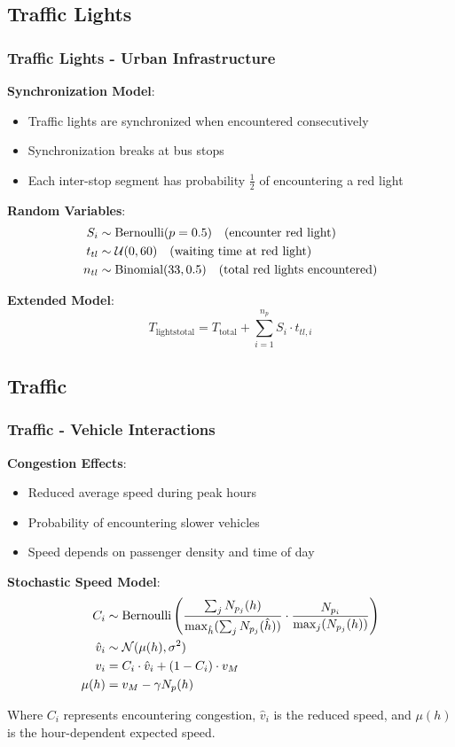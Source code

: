 \documentclass[12pt]{beamer}
\begin{document}
\subsection{Traffic Lights}
\begin{frame}
\frametitle{Traffic Lights - Urban Infrastructure}
\textbf{Synchronization Model}:
\begin{itemize}
\item Traffic lights are synchronized when encountered consecutively
\item Synchronization breaks at bus stops
\item Each inter-stop segment has probability $\frac{1}{2}$ of encountering a red light
\end{itemize}

\vspace{0.3cm}
\textbf{Random Variables}:
\begin{align}
S_i &\sim \text{Bernoulli}(p = 0.5) \quad \text{(encounter red light)}  \notag\\
t_{tl} &\sim \mathcal{U}(0, 60) \quad \text{(waiting time at red light)}  \notag\\
n_{tl} &\sim \text{Binomial}(33, 0.5) \quad \text{(total red lights encountered)} \notag
\end{align}

\vspace{0.3cm}
\textbf{Extended Model}:
\begin{equation}
T_{\text{lightstotal}} = T_{\text{total}} + \sum_{i=1}^{n_p} S_i \cdot t_{tl,i}
\end{equation}
\end{frame}

\subsection{Traffic}
\begin{frame}
\frametitle{Traffic - Vehicle Interactions}
\textbf{Congestion Effects}:
\begin{itemize}
\item Reduced average speed during peak hours
\item Probability of encountering slower vehicles
\item Speed depends on passenger density and time of day
\end{itemize}

\vspace{0.3cm}
\textbf{Stochastic Speed Model}:
\begin{align}
C_i &\sim \text{Bernoulli}\left(\frac{\sum_j N_{p_j}(h)}{\max_{\hat{h}}(\sum_j N_{p_j}(\hat{h}))} \cdot \frac{N_{p_i}}{\max_j(N_{p_j}(h))}\right)  \notag\\
\hat{v}_i &\sim \mathcal{N}(\mu(h), \sigma^2)  \notag\\
v_i &= C_i \cdot \hat{v}_i + (1-C_i) \cdot v_M  \notag\\
\mu(h) &= v_M - \gamma N_p(h) \notag
\end{align}

Where $C_i$ represents encountering congestion, $\hat{v}_i$ is the reduced speed, and $\mu(h)$ is the hour-dependent expected speed.
\end{frame}
\end{document}
